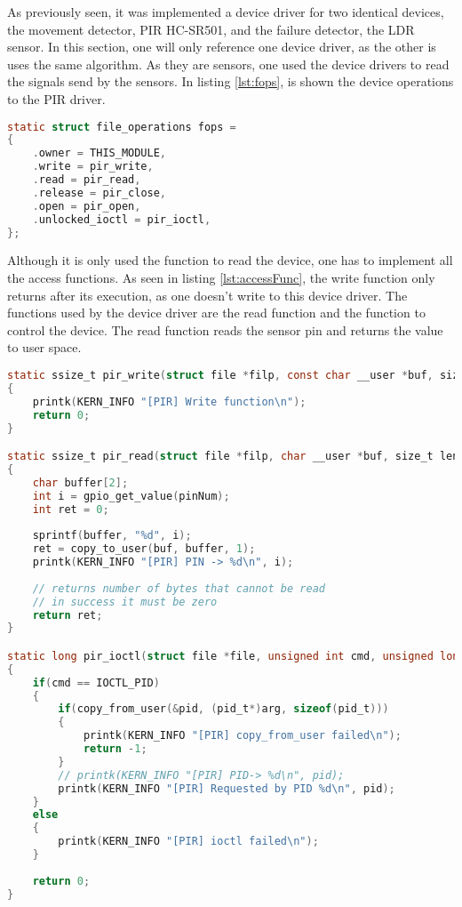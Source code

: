 %
As previously seen, it was implemented a device driver for two identical devices, the movement detector, PIR HC-SR501, and the failure detector, the LDR sensor. In this section, one will only reference one device driver, as the other is uses the same algorithm. As they are sensors, one used the device drivers to read the signals send by the sensors. In listing \ref{lst:fops}, is shown the device operations to the PIR driver.

\begin{lstlisting}[language=C, caption={Device Driver Operations.}, label={lst:fops}]
static struct file_operations fops = 
{
	.owner = THIS_MODULE,
	.write = pir_write,
	.read = pir_read,
	.release = pir_close,
	.open = pir_open,
	.unlocked_ioctl = pir_ioctl,
};
\end{lstlisting}

Although it is only used the function to read the device, one has to implement all the access functions. As seen in listing \ref{lst:accessFunc}, the write function only returns after its execution, as one doesn't write to this device driver. The functions used by the device driver are the read function and the function to control the device. The read function reads the sensor pin and returns the value to user space.

\begin{lstlisting}[language=C, caption={Device Driver access functions implementation.}, label={lst:accessFunc}]
static ssize_t pir_write(struct file *filp, const char __user *buf, size_t len, loff_t *off) 
{	
	printk(KERN_INFO "[PIR] Write function\n");
	return 0;
}

static ssize_t pir_read(struct file *filp, char __user *buf, size_t len, loff_t *off)
{
	char buffer[2];
	int i = gpio_get_value(pinNum);
	int ret = 0;
	
	sprintf(buffer, "%d", i);
	ret = copy_to_user(buf, buffer, 1);
	printk(KERN_INFO "[PIR] PIN -> %d\n", i);
	
	// returns number of bytes that cannot be read
	// in success it must be zero
	return ret;
}

static long pir_ioctl(struct file *file, unsigned int cmd, unsigned long arg)
{	
	if(cmd == IOCTL_PID)
	{
		if(copy_from_user(&pid, (pid_t*)arg, sizeof(pid_t))) 
		{
			printk(KERN_INFO "[PIR] copy_from_user failed\n"); 
			return -1;
		}
		// printk(KERN_INFO "[PIR] PID-> %d\n", pid);
		printk(KERN_INFO "[PIR] Requested by PID %d\n", pid);
	}
	else
	{
		printk(KERN_INFO "[PIR] ioctl failed\n");	
	}
	
	return 0;
}
\end{lstlisting}

